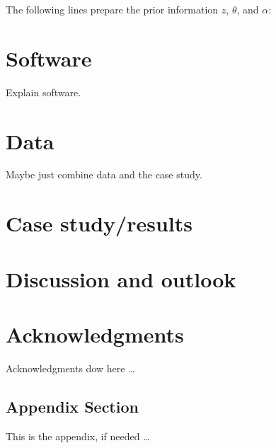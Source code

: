 \documentclass[article,nojss,shortnames]{jss}
\begin{document}
The following lines prepare the prior information $z$, $\theta$, and $\alpha$:



\section{Software}

Explain software.


\section{Data}

Maybe just combine data and the case study.

\section{Case study/results}


\section{Discussion and outlook}




\section*{Acknowledgments}

Acknowledgments dow here \dots


\newpage


\newpage

\begin{appendix}

\section{Appendix Section}

This is the appendix, if needed \dots

\end{appendix}
\end{document}
